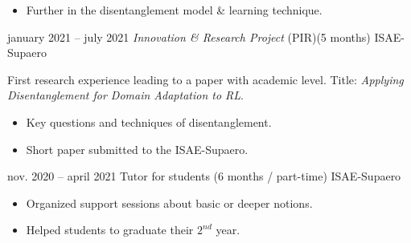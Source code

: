 \documentclass[
    a4paper,
]{fortysecondscv}
\begin{document}
\begin{cvtable}[4]
{            \begin{itemize}
                \item Further in the disentanglement model \& learning technique.
            \end{itemize}
        }
    \cvitem
        {january 2021 -- july 2021}
        {\textit{Innovation \& Research Project} (PIR)\newline (5 months)}
        {ISAE-Supaero}
        {
            First research experience leading to a paper with academic level.\newline
            Title: \textit{Applying Disentanglement for Domain Adaptation to RL}.
            \begin{itemize}
                \item Key questions and techniques of disentanglement.
                \item Short paper submitted to the ISAE-Supaero.
            \end{itemize}
        }
    \cvitem
        {nov. 2020 -- april 2021}
        {Tutor for students \newline (6 months / part-time)}
        {ISAE-Supaero}
        {
            \begin{itemize}
                \item Organized support sessions about basic or deeper notions.
                \item Helped students to graduate their $2^{nd}$ year.
            \end{itemize}
        }
\end{cvtable}
\cvsignature
\end{document}
